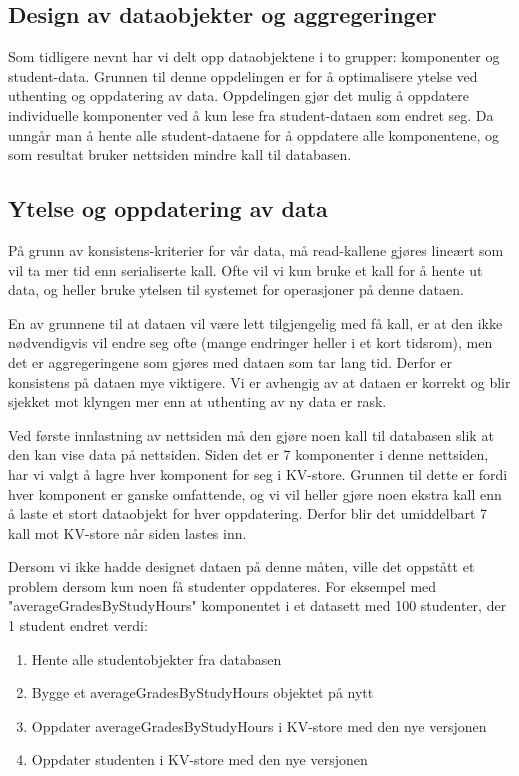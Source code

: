 \subsection{Design av dataobjekter og aggregeringer}
Som tidligere nevnt har vi delt opp dataobjektene i to grupper: komponenter og student-data. Grunnen til denne oppdelingen er for å optimalisere ytelse ved uthenting og oppdatering av data. Oppdelingen gjør det mulig å oppdatere individuelle komponenter ved å kun lese fra student-dataen som endret seg. Da unngår man å hente alle student-dataene for å oppdatere alle komponentene, og som resultat bruker nettsiden mindre kall til databasen.

\subsection{Ytelse og oppdatering av data}
På grunn av konsistens-kriterier for vår data, må read-kallene gjøres lineært som vil ta mer tid enn serialiserte kall. Ofte vil vi kun bruke et kall for å hente ut data, og heller bruke ytelsen til systemet for operasjoner på denne dataen.

En av grunnene til at dataen vil være lett tilgjengelig med få kall, er at den ikke nødvendigvis vil endre seg ofte (mange endringer heller i et kort tidsrom), men det er aggregeringene som gjøres med dataen som tar lang tid. Derfor er konsistens på dataen mye viktigere. Vi er avhengig av at dataen er korrekt og blir sjekket mot klyngen mer enn at uthenting av ny data er rask.

Ved første innlastning av nettsiden må den gjøre noen kall til databasen slik at den kan vise data på nettsiden. Siden det er 7 komponenter i denne nettsiden, har vi valgt å lagre hver komponent for seg i KV-store. Grunnen til dette er fordi hver komponent er ganske omfattende, og vi vil heller gjøre noen ekstra kall enn å laste et stort dataobjekt for hver oppdatering. Derfor blir det umiddelbart 7 kall mot KV-store når siden lastes inn.

Dersom vi ikke hadde designet dataen på denne måten, ville det oppstått  et problem dersom kun noen få studenter oppdateres. For eksempel med "averageGradesByStudyHours" komponentet i et datasett med 100 studenter, der 1 student endret verdi:

\begin{enumerate}
  \item Hente alle studentobjekter fra databasen
  \item Bygge et averageGradesByStudyHours objektet på nytt
  \item Oppdater averageGradesByStudyHours i KV-store med den nye versjonen
  \item Oppdater studenten i KV-store med den nye versjonen
\end{enumerate}

